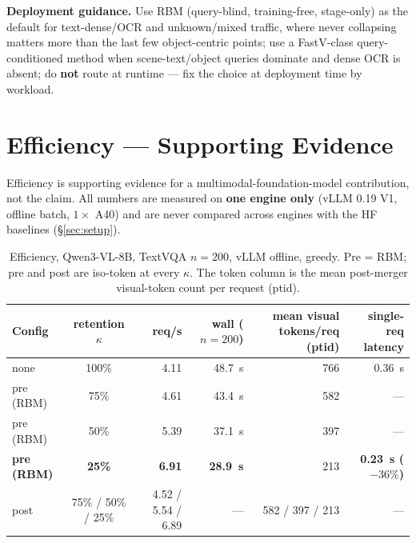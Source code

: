 \documentclass[sigconf,review,anonymous]{acmart}
\begin{document}
\textbf{Deployment guidance.} Use RBM (query-blind, training-free, stage-only)
as the default for text-dense/OCR and unknown/mixed traffic, where never
collapsing matters more than the last few object-centric points; use a
FastV-class query-conditioned method when scene-text/object queries dominate and
dense OCR is absent; do \textbf{not} route at runtime --- fix the
choice at deployment time by workload.

\section{Efficiency --- Supporting Evidence}\label{sec:efficiency}

Efficiency is supporting evidence for a multimodal-foundation-model
contribution, not the claim. All numbers are measured on \textbf{one engine
only} (vLLM 0.19 V1, offline batch, $1\times$ A40) and are never compared across
engines with the HF baselines (\S\ref{sec:setup}).

\begin{table}[t]
  \centering
  \small
  \caption{Efficiency, Qwen3-VL-8B, TextVQA $n = 200$, vLLM offline, greedy.
    Pre = RBM; pre and post are iso-token at every $\kappa$. The token column is
    the mean post-merger visual-token count per request (ptid).}
  \label{tab:tab4}
  \begin{tabular}{@{}l c r r r r@{}}
    \toprule
    Config & retention $\kappa$ & req/s & wall ($n = 200$) & mean visual tokens/req (ptid) & single-req latency \\
    \midrule
    none             & 100\%            & 4.11 & 48.7~s & 766         & 0.36~s \\
    pre (RBM)        & 75\%             & 4.61 & 43.4~s & 582         & --- \\
    pre (RBM)        & 50\%             & 5.39 & 37.1~s & 397         & --- \\
    \textbf{pre (RBM)} & \textbf{25\%}  & \textbf{6.91} & \textbf{28.9~s} & 213 & \textbf{0.23~s ($-36\%$)} \\
    post             & 75\% / 50\% / 25\% & 4.52 / 5.54 / 6.89 & --- & 582 / 397 / 213 & --- \\
    \bottomrule
  \end{tabular}
\end{table}
\end{document}
